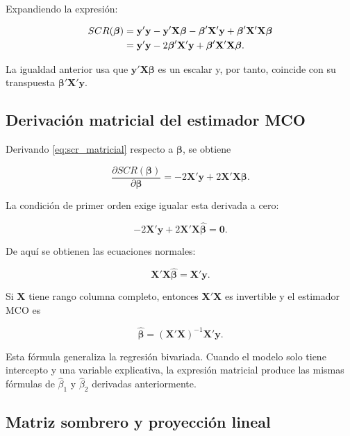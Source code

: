 \documentclass[11pt,a4paper]{article}
\begin{document}
Expandiendo la expresión:

\begin{align}
SCR(\boldsymbol{\beta})
&=\mathbf{y}'\mathbf{y}-\mathbf{y}'\mathbf{X}\boldsymbol{\beta}
-\boldsymbol{\beta}'\mathbf{X}'\mathbf{y}
+\boldsymbol{\beta}'\mathbf{X}'\mathbf{X}\boldsymbol{\beta} \notag\\
&=\mathbf{y}'\mathbf{y}-2\boldsymbol{\beta}'\mathbf{X}'\mathbf{y}
+\boldsymbol{\beta}'\mathbf{X}'\mathbf{X}\boldsymbol{\beta}. \label{eq:scr_matricial}
\end{align}

La igualdad anterior usa que \(\mathbf{y}'\mathbf{X}\boldsymbol{\beta}\) es un escalar y, por tanto, coincide con su transpuesta \(\boldsymbol{\beta}'\mathbf{X}'\mathbf{y}\).

\subsection{Derivación matricial del estimador MCO}

Derivando \eqref{eq:scr_matricial} respecto a \(\boldsymbol{\beta}\), se obtiene

\[
\frac{\partial SCR(\boldsymbol{\beta})}{\partial\boldsymbol{\beta}}
=-2\mathbf{X}'\mathbf{y}+2\mathbf{X}'\mathbf{X}\boldsymbol{\beta}.
\]

La condición de primer orden exige igualar esta derivada a cero:

\[
-2\mathbf{X}'\mathbf{y}+2\mathbf{X}'\mathbf{X}\hat{\boldsymbol{\beta}}=\mathbf{0}.
\]

De aquí se obtienen las ecuaciones normales:

\[
\mathbf{X}'\mathbf{X}\hat{\boldsymbol{\beta}}=\mathbf{X}'\mathbf{y}.
\]

Si \(\mathbf{X}\) tiene rango columna completo, entonces \(\mathbf{X}'\mathbf{X}\) es invertible y el estimador MCO es

\begin{resultado}
\[
\boxed{\hat{\boldsymbol{\beta}}=(\mathbf{X}'\mathbf{X})^{-1}\mathbf{X}'\mathbf{y}}.
\]
\end{resultado}

Esta fórmula generaliza la regresión bivariada. Cuando el modelo solo tiene intercepto y una variable explicativa, la expresión matricial produce las mismas fórmulas de \(\hat{\beta}_1\) y \(\hat{\beta}_2\) derivadas anteriormente.

\subsection{Matriz sombrero y proyección lineal}
\end{document}
